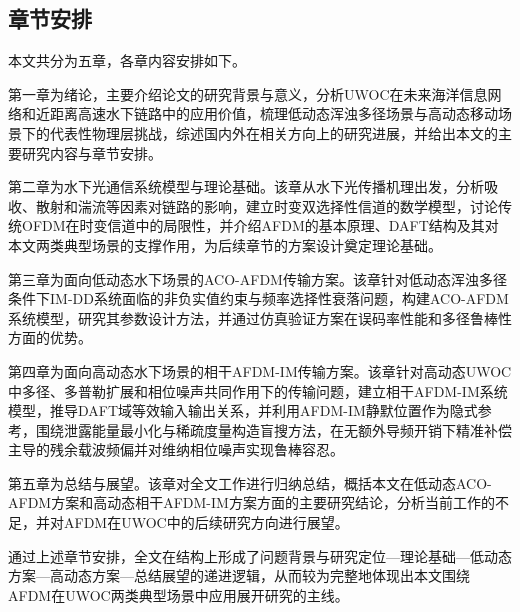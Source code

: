 \subsection{章节安排}
\label{subsec:chapter_arrangement}

本文共分为五章，各章内容安排如下。

第一章为绪论，主要介绍论文的研究背景与意义，分析UWOC在未来海洋信息网络和近距离高速水下链路中的应用价值，梳理低动态浑浊多径场景与高动态移动场景下的代表性物理层挑战，综述国内外在相关方向上的研究进展，并给出本文的主要研究内容与章节安排。

第二章为水下光通信系统模型与理论基础。该章从水下光传播机理出发，分析吸收、散射和湍流等因素对链路的影响，建立时变双选择性信道的数学模型，讨论传统OFDM在时变信道中的局限性，并介绍AFDM的基本原理、DAFT结构及其对本文两类典型场景的支撑作用，为后续章节的方案设计奠定理论基础。

第三章为面向低动态水下场景的ACO-AFDM传输方案。该章针对低动态浑浊多径条件下IM-DD系统面临的非负实值约束与频率选择性衰落问题，构建ACO-AFDM系统模型，研究其参数设计方法，并通过仿真验证方案在误码率性能和多径鲁棒性方面的优势。

第四章为面向高动态水下场景的相干AFDM-IM传输方案。该章针对高动态UWOC中多径、多普勒扩展和相位噪声共同作用下的传输问题，建立相干AFDM-IM系统模型，推导DAFT域等效输入输出关系，并利用AFDM-IM静默位置作为隐式参考，围绕泄露能量最小化与稀疏度量构造盲搜方法，在无额外导频开销下精准补偿主导的残余载波频偏并对维纳相位噪声实现鲁棒容忍。

第五章为总结与展望。该章对全文工作进行归纳总结，概括本文在低动态ACO-AFDM方案和高动态相干AFDM-IM方案方面的主要研究结论，分析当前工作的不足，并对AFDM在UWOC中的后续研究方向进行展望。

通过上述章节安排，全文在结构上形成了问题背景与研究定位—理论基础—低动态方案—高动态方案—总结展望的递进逻辑，从而较为完整地体现出本文围绕AFDM在UWOC两类典型场景中应用展开研究的主线。

